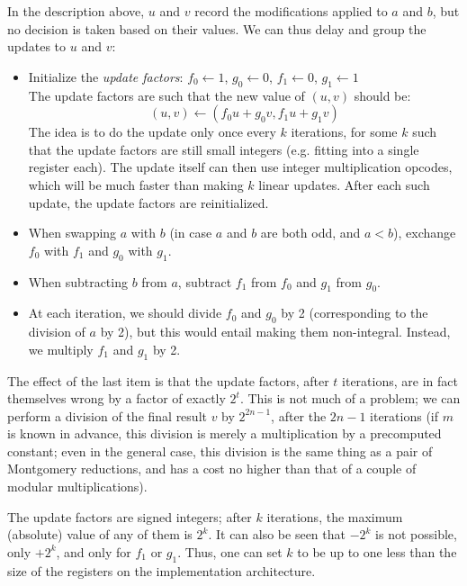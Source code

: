 \documentclass{llncs}
\begin{document}
In the description above, $u$ and $v$ record the modifications applied
to $a$ and $b$, but no decision is taken based on their values. We can
thus delay and group the updates to $u$ and $v$:
\begin{itemize}

    \item Initialize the \emph{update factors}:
    $f_0 \leftarrow 1$, $g_0 \leftarrow 0$,
    $f_1 \leftarrow 0$, $g_1 \leftarrow 1$ \\
    The update factors are such that the new value of $(u, v)$ should be:
    \begin{equation*}
        (u, v) \leftarrow (f_0 u + g_0 v, f_1 u + g_1 v)
    \end{equation*}
    The idea is to do the update only once every $k$ iterations, for
    some $k$ such that the update factors are still small integers (e.g.
    fitting into a single register each). The update itself can then use
    integer multiplication opcodes, which will be much faster than
    making $k$ linear updates. After each such update, the update
    factors are reinitialized.

    \item When swapping $a$ with $b$ (in case $a$ and $b$ are both odd,
    and $a < b$), exchange $f_0$ with $f_1$ and $g_0$ with $g_1$.

    \item When subtracting $b$ from $a$, subtract $f_1$ from $f_0$ and
    $g_1$ from $g_0$.

    \item At each iteration, we should divide $f_0$ and $g_0$ by 2
    (corresponding to the division of $a$ by 2), but this would entail
    making them non-integral. Instead, we multiply $f_1$ and $g_1$ by 2.

\end{itemize}

The effect of the last item is that the update factors, after $t$
iterations, are in fact themselves wrong by a factor of exactly $2^t$.
This is not much of a problem; we can perform a division of the final
result $v$ by $2^{2n-1}$, after the $2n-1$ iterations (if $m$ is known
in advance, this division is merely a multiplication by a precomputed
constant; even in the general case, this division is the same thing as a
pair of Montgomery reductions, and has a cost no higher than that of a
couple of modular multiplications).

The update factors are signed integers; after $k$ iterations, the
maximum (absolute) value of any of them is $2^k$. It can also be seen
that $-2^k$ is not possible, only $+2^k$, and only for $f_1$ or $g_1$.
Thus, one can set $k$ to be up to one less than the size of the
registers on the implementation architecture.
\end{document}
